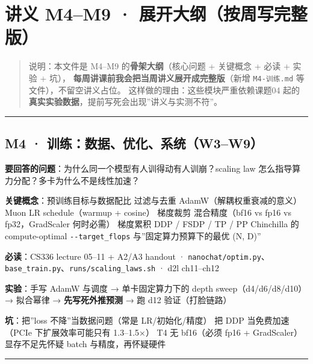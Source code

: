 \documentclass[
  chinese,
  11pt,
]{ctexart}
\begin{document}
\newpage

\section{讲义 M4--M9 · 展开大纲（按周写完整版）}\label{ux8bb2ux4e49-m4m9-ux5c55ux5f00ux5927ux7eb2ux6309ux5468ux5199ux5b8cux6574ux7248}

\begin{quote}
说明：本文件是 M4--M9 的\textbf{骨架大纲}（核心问题 + 关键概念 + 必读 + 实验 + 坑）， \textbf{每周讲课前我会把当周讲义展开成完整版}（新增 \texttt{M4-训练.md} 等文件），不留空讲义占位。 这样做的理由：这些模块严重依赖课题04 起的\textbf{真实实验数据}，提前写死会出现''讲义与实测不符''。
\end{quote}

\begin{center}\rule{0.5\linewidth}{0.5pt}\end{center}

\subsection{M4 · 训练：数据、优化、系统（W3--W9）}\label{m4-ux8badux7ec3ux6570ux636eux4f18ux5316ux7cfbux7edfw3w9}

\textbf{要回答的问题}：为什么同一个模型有人训得动有人训崩？scaling law 怎么指导算力分配？多卡为什么不是线性加速？

\textbf{关键概念}：预训练目标与数据配比 \textbar{} 过滤与去重 \textbar{} AdamW（解耦权重衰减的意义）\textbar{} Muon \textbar{} LR schedule（warmup + cosine）\textbar{} 梯度裁剪 \textbar{} 混合精度（bf16 vs fp16 vs fp32，GradScaler 何时必需）\textbar{} 梯度累积 \textbar{} DDP / FSDP / TP / PP \textbar{} Chinchilla 的 compute-optimal \textbar{} \texttt{-\/-target\_flops} 与''固定算力预算下的最优 (N, D)''

\textbf{必读}：CS336 lecture 05--11 + A2/A3 handout · \texttt{nanochat/optim.py}、\texttt{base\_train.py}、\texttt{runs/scaling\_laws.sh} · d2l ch11--ch12

\textbf{实验}：手写 AdamW 与调度 → 单卡固定算力下的 depth sweep（d4/d6/d8/d10）→ 拟合幂律 → \textbf{先写死外推预测} → 跑 d12 验证（打脸链路）

\textbf{坑}：把''loss 不降''当数据问题（常是 LR/初始化/精度）\textbar{} 把 DDP 当免费加速（PCIe 下扩展效率可能只有 1.3--1.5×）\textbar{} T4 无 bf16（必须 fp16 + GradScaler）\textbar{} 显存不足先怀疑 batch 与精度，再怀疑硬件

\begin{center}\rule{0.5\linewidth}{0.5pt}\end{center}
\end{document}
